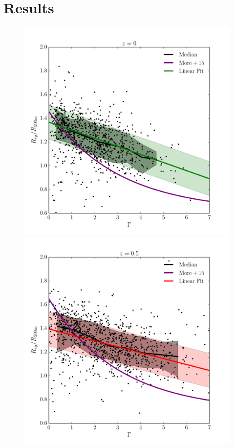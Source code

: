 \documentclass[numberedappendix,apj]{emulateapj}
\begin{document}
\section{Results}
\label{sec:results}

\begin{figure}
   \centering
   \includegraphics[width=\columnwidth]{z0_fit.pdf}
   \includegraphics[width=\columnwidth]{z05_fit.pdf}\\

\end{figure}
\end{document}
